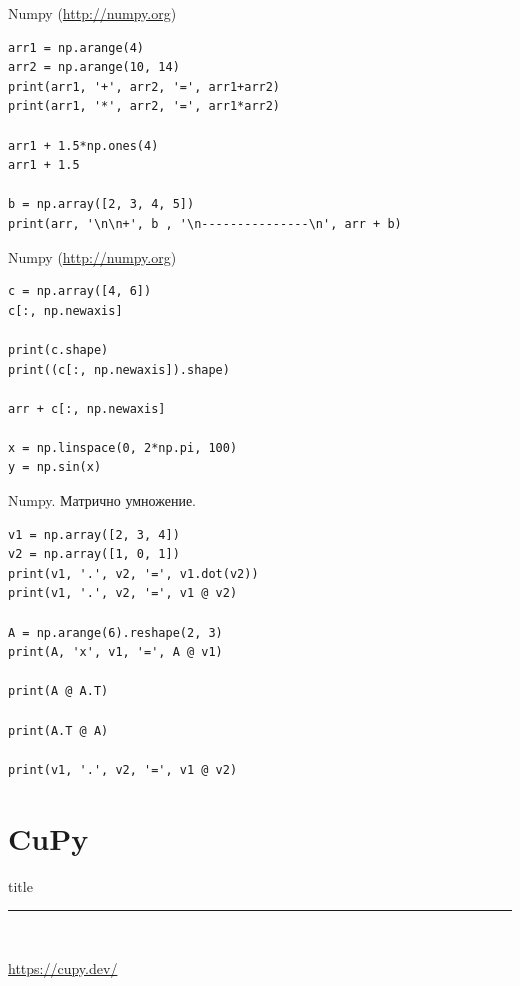 \documentclass{beamer}
\begin{document}
\begin{frame}[fragile]{Numpy (\url{http://numpy.org}) }
\begin{lstlisting}
arr1 = np.arange(4)
arr2 = np.arange(10, 14)
print(arr1, '+', arr2, '=', arr1+arr2)
print(arr1, '*', arr2, '=', arr1*arr2)

arr1 + 1.5*np.ones(4)
arr1 + 1.5

b = np.array([2, 3, 4, 5])
print(arr, '\n\n+', b , '\n---------------\n', arr + b)
\end{lstlisting}

\end{frame}

\begin{frame}[fragile]{Numpy (\url{http://numpy.org}) }
\begin{lstlisting}
c = np.array([4, 6])
c[:, np.newaxis]

print(c.shape)
print((c[:, np.newaxis]).shape)

arr + c[:, np.newaxis]

x = np.linspace(0, 2*np.pi, 100)
y = np.sin(x)
\end{lstlisting}

\end{frame}

\begin{frame}[fragile]{Numpy. Матрично умножение.}
\begin{lstlisting}
v1 = np.array([2, 3, 4])
v2 = np.array([1, 0, 1])
print(v1, '.', v2, '=', v1.dot(v2))
print(v1, '.', v2, '=', v1 @ v2)

A = np.arange(6).reshape(2, 3)
print(A, 'x', v1, '=', A @ v1)

print(A @ A.T)

print(A.T @ A)

print(v1, '.', v2, '=', v1 @ v2)

\end{lstlisting}

\end{frame}

\section{CuPy}
\begin{frame}[plain]
  \vfill
  \centering
  \begin{beamercolorbox}[sep=8pt,center,shadow=true,rounded=true]{title}
    \par%
    \color{oxfordblue}\noindent\rule{10cm}{1pt} \\
  \end{beamercolorbox}
  \url{https://cupy.dev/}
  \vfill
\end{frame}
\end{document}
